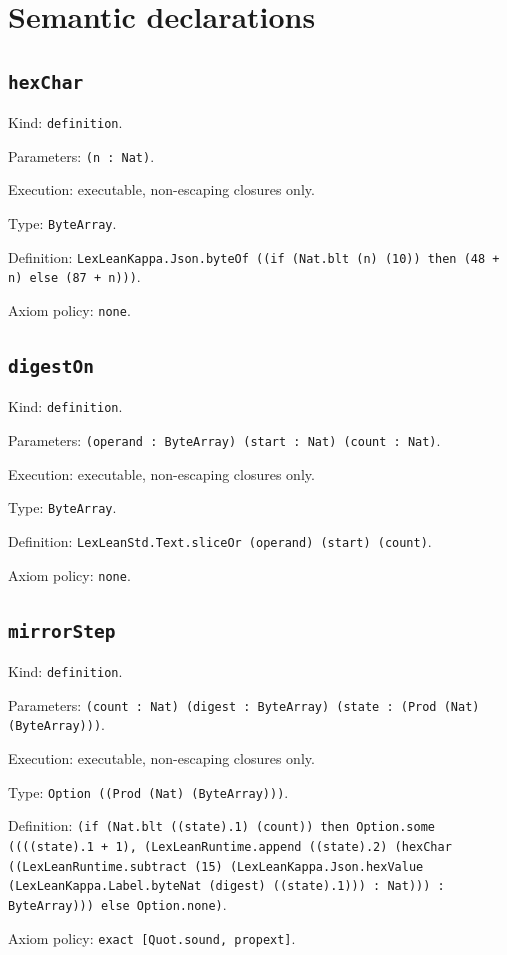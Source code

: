 \documentclass[11pt]{article}
\begin{document}
\section*{Semantic declarations}
\subsection*{\texttt{hexChar}}
\noindent Kind: \texttt{definition}.\par
\noindent Parameters: \texttt{(n : Nat)}.\par
\noindent Execution: executable, non-escaping closures only.\par
\noindent Type: \texttt{ByteArray}.\par
\noindent Definition: \texttt{LexLeanKappa.Json.byteOf ((if (Nat.blt (n) (10)) then (48 + n) else (87 + n)))}.\par
\noindent Axiom policy: \texttt{none}.\par
\subsection*{\texttt{digestOn}}
\noindent Kind: \texttt{definition}.\par
\noindent Parameters: \texttt{(operand : ByteArray) (start : Nat) (count : Nat)}.\par
\noindent Execution: executable, non-escaping closures only.\par
\noindent Type: \texttt{ByteArray}.\par
\noindent Definition: \texttt{LexLeanStd.Text.sliceOr (operand) (start) (count)}.\par
\noindent Axiom policy: \texttt{none}.\par
\subsection*{\texttt{mirrorStep}}
\noindent Kind: \texttt{definition}.\par
\noindent Parameters: \texttt{(count : Nat) (digest : ByteArray) (state : (Prod (Nat) (ByteArray)))}.\par
\noindent Execution: executable, non-escaping closures only.\par
\noindent Type: \texttt{Option ((Prod (Nat) (ByteArray)))}.\par
\noindent Definition: \texttt{(if (Nat.blt ((state).1) (count)) then Option.some ((((state).1 + 1), (LexLeanRuntime.append ((state).2) (hexChar ((LexLeanRuntime.subtract (15) (LexLeanKappa.Json.hexValue (LexLeanKappa.Label.byteNat (digest) ((state).1))) : Nat))) : ByteArray))) else Option.none)}.\par
\noindent Axiom policy: \texttt{exact [Quot.sound, propext]}.\par
\end{document}
